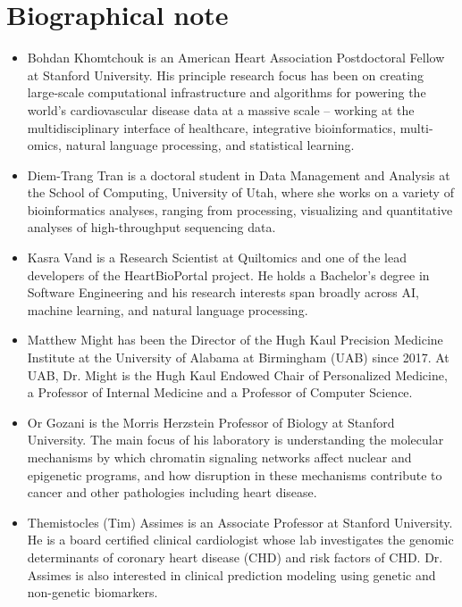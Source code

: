 \documentclass[11pt,letterpaper]{article}
\begin{document}
	\section*{Biographical note}
	\begin{itemize}
		\item Bohdan Khomtchouk is an American Heart Association Postdoctoral Fellow at Stanford University.  His principle research focus has been on creating large-scale computational infrastructure and algorithms for powering the world's cardiovascular disease data at a massive scale -- working at the multidisciplinary interface of healthcare, integrative bioinformatics, multi-omics, natural language processing, and statistical learning.
		
		\item Diem-Trang Tran is a doctoral student in Data Management and Analysis at the School of Computing, University of Utah, where she works on a variety of bioinformatics analyses, ranging from processing, visualizing and quantitative analyses of high-throughput sequencing data.
		
		\item Kasra Vand is a Research Scientist at Quiltomics and one of the lead developers of the HeartBioPortal project.  He holds a Bachelor's degree in Software Engineering and his research interests span broadly across AI, machine learning, and natural language processing.
		
		\item Matthew Might has been the Director of the Hugh Kaul Precision Medicine Institute at the University of Alabama at Birmingham (UAB) since 2017.  At UAB, Dr. Might is the Hugh Kaul Endowed Chair of Personalized Medicine, a Professor of Internal Medicine and a Professor of Computer Science.
		
		\item Or Gozani is the Morris Herzstein Professor of Biology at Stanford University.  The main focus of his laboratory is understanding the molecular mechanisms by which chromatin signaling networks affect nuclear and epigenetic programs, and how disruption in these mechanisms contribute to cancer and other pathologies including heart disease.
		
		\item Themistocles (Tim) Assimes is an Associate Professor at Stanford University.  He is a board certified clinical cardiologist whose lab investigates the genomic determinants of coronary heart disease (CHD) and risk factors of CHD.  Dr. Assimes is also interested in clinical prediction modeling using genetic and non-genetic biomarkers.
	\end{itemize}
\end{document}
